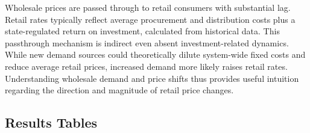 \documentclass[sigconf]{acmart}
\begin{document}
Wholesale prices are passed through to retail consumers with substantial lag. Retail rates typically reflect average procurement and distribution costs plus a state-regulated return on investment, calculated from historical data. This passthrough mechanism is indirect even absent investment-related dynamics. While new demand sources could theoretically dilute system-wide fixed costs and reduce average retail prices, increased demand more likely raises retail rates. Understanding wholesale demand and price shifts thus provides useful intuition regarding the direction and magnitude of retail price changes.

\newpage

\subsection{Results Tables}
\end{document}
